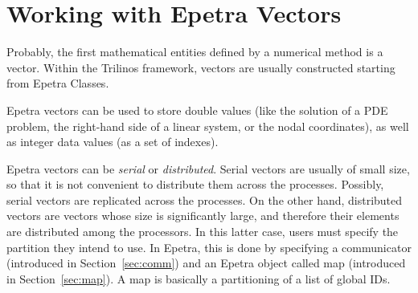% 
% 
% 
%   
%   
% 
% 

\chapter{Working with Epetra Vectors}
\label{chap:epetra_vec}

Probably, the first mathematical entities defined by a numerical method
is a vector. Within the Trilinos framework, vectors are usually
constructed starting from Epetra Classes.

Epetra vectors can be used to store double values (like the solution of
a PDE problem, the right-hand side of a linear system, or the nodal
coordinates), as well as integer data values (as a set of indexes).

Epetra vectors can be {\em serial} or {\em distributed}. Serial vectors
are usually of small size, so that it is not convenient to distribute
them across the processes. Possibly, serial vectors are replicated
across the processes. On the other hand, distributed vectors are vectors
whose size is significantly large, and therefore their elements are
distributed among the processors. In this latter case, users must
specify the partition they intend to use.  In Epetra, this is done by
specifying a communicator (introduced in Section~\ref{sec:comm}) and an
Epetra object called map (introduced in Section~\ref{sec:map}). A map is
basically a partitioning of a list of global IDs.

